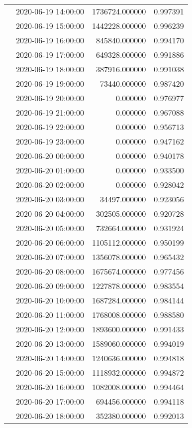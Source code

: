 \begin{tabular}{llrr}
 & 2020-06-19 14:00:00 & 1736724.000000 & 0.997391 \\
 & 2020-06-19 15:00:00 & 1442228.000000 & 0.996239 \\
 & 2020-06-19 16:00:00 & 845840.000000 & 0.994170 \\
 & 2020-06-19 17:00:00 & 649328.000000 & 0.991886 \\
 & 2020-06-19 18:00:00 & 387916.000000 & 0.991038 \\
 & 2020-06-19 19:00:00 & 73440.000000 & 0.987420 \\
 & 2020-06-19 20:00:00 & 0.000000 & 0.976977 \\
 & 2020-06-19 21:00:00 & 0.000000 & 0.967088 \\
 & 2020-06-19 22:00:00 & 0.000000 & 0.956713 \\
 & 2020-06-19 23:00:00 & 0.000000 & 0.947162 \\
 & 2020-06-20 00:00:00 & 0.000000 & 0.940178 \\
 & 2020-06-20 01:00:00 & 0.000000 & 0.933500 \\
 & 2020-06-20 02:00:00 & 0.000000 & 0.928042 \\
 & 2020-06-20 03:00:00 & 34497.000000 & 0.923056 \\
 & 2020-06-20 04:00:00 & 302505.000000 & 0.920728 \\
 & 2020-06-20 05:00:00 & 732664.000000 & 0.931924 \\
 & 2020-06-20 06:00:00 & 1105112.000000 & 0.950199 \\
 & 2020-06-20 07:00:00 & 1356078.000000 & 0.965432 \\
 & 2020-06-20 08:00:00 & 1675674.000000 & 0.977456 \\
 & 2020-06-20 09:00:00 & 1227878.000000 & 0.983554 \\
 & 2020-06-20 10:00:00 & 1687284.000000 & 0.984144 \\
 & 2020-06-20 11:00:00 & 1768008.000000 & 0.988580 \\
 & 2020-06-20 12:00:00 & 1893600.000000 & 0.991433 \\
 & 2020-06-20 13:00:00 & 1589060.000000 & 0.994019 \\
 & 2020-06-20 14:00:00 & 1240636.000000 & 0.994818 \\
 & 2020-06-20 15:00:00 & 1118932.000000 & 0.994872 \\
 & 2020-06-20 16:00:00 & 1082008.000000 & 0.994464 \\
 & 2020-06-20 17:00:00 & 694456.000000 & 0.994118 \\
 & 2020-06-20 18:00:00 & 352380.000000 & 0.992013 \\

\end{tabular}
